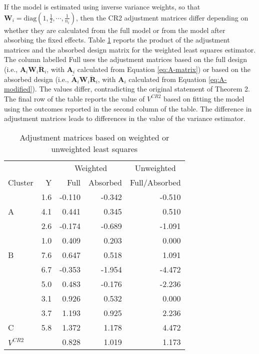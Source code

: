 \documentclass[12pt]{article}
\begin{document}
If the model is estimated using inverse variance weights, so that
\(\mathbf{W}_i = \text{diag}\left(1, \frac{1}{2}, \cdots, \frac{1}{n_i}\right)\),
then the CR2 adjustment matrices differ depending on whether they are
calculated from the full model or from the model after absorbing the
fixed effects. Table \ref{tab:example} reports the product of the
adjustment matrices and the absorbed design matrix for the weighted
least squares estimator. The column labelled Full uses the adjustment
matrices based on the full design (i.e.,
\(\mathbf{A}_i \mathbf{W}_i \mathbf{\ddot{R}}_i\), with \(\mathbf{A}_i\)
calculated from Equation \ref{eq:A-matrix}) or based on the absorbed
design (i.e., \(\mathbf{\tilde{A}}_i \mathbf{W}_i \mathbf{\ddot{R}}_i\),
with \(\mathbf{A}_i\) calculated from Equation \ref{eq:A-modified}). The
values differ, contradicting the original statement of Theorem 2. The
final row of the table reports the value of \(V^{CR2}\) based on fitting
the model using the outcomes reported in the second column of the table.
The difference in adjustment matrices leads to differences in the value
of the variance estimator.

\begin{table}

\caption{\label{tab:example}Adjustment matrices based on weighted or unweighted least squares}
\centering
\begin{tabular}[t]{lrrrr}
\toprule
\multicolumn{2}{c}{ } & \multicolumn{2}{c}{Weighted} & \multicolumn{1}{c}{Unweighted} \\
\cmidrule(l{3pt}r{3pt}){3-4} \cmidrule(l{3pt}r{3pt}){5-5}
Cluster & Y & Full & Absorbed & Full/Absorbed\\
\midrule
 & 1.6 & -0.110 & -0.342 & -0.510\\

\multirow[t]{-2}{*}{\raggedright\arraybackslash A} & 4.1 & 0.441 & 0.345 & 0.510\\

 & 2.6 & -0.174 & -0.689 & -1.091\\

 & 1.0 & 0.409 & 0.203 & 0.000\\

\multirow[t]{-3}{*}{\raggedright\arraybackslash B} & 7.6 & 0.647 & 0.518 & 1.091\\

 & 6.7 & -0.353 & -1.954 & -4.472\\

 & 5.0 & 0.483 & -0.176 & -2.236\\

 & 3.1 & 0.926 & 0.532 & 0.000\\

 & 3.7 & 1.193 & 0.925 & 2.236\\

\multirow[t]{-5}{*}{\raggedright\arraybackslash C} & 5.8 & 1.372 & 1.178 & 4.472\\
\midrule

$V^{CR2}$ &  & 0.828 & 1.019 & 1.173\\
\bottomrule
\end{tabular}
\end{table}
\end{document}
